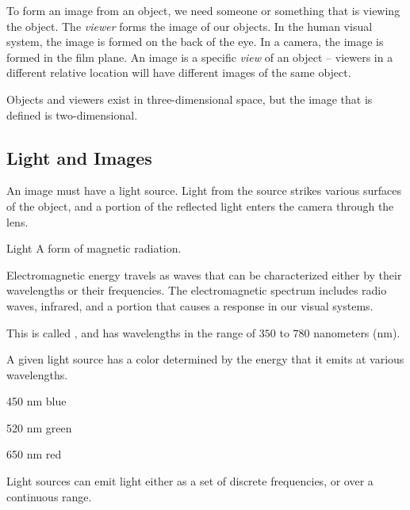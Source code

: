 \documentclass[\main/notes.tex]{subfiles}
\begin{document}
        To form an image from an object, we need someone or something that is viewing the object.
        The \emph{viewer} forms the image of our objects.
        In the human visual system, the image is formed on the back of the eye.
        In a camera, the image is formed in the film plane.
        An image is a specific \emph{view} of an object -- viewers in a different relative
        location will have different images of the same object.

        Objects and viewers exist in three-dimensional space,
        but the image that is defined is two-dimensional.

      \subsection{Light and Images}
        An image must have a light source.
        Light from the source strikes various surfaces of the object,
        and a portion of the reflected light enters the camera through the lens.

        \begin{definition}{Light}
          A form of magnetic radiation.

          Electromagnetic energy travels as waves that can be characterized either by
          their wavelengths or their frequencies.
          The electromagnetic spectrum includes radio waves, infrared, and a portion that
          causes a response in our visual systems.

          This  is called ,
          and has wavelengths in the range of $350$ to $780$ nanometers (nm).

          A given light source has a color determined by the energy that it emits at various
          wavelengths.

          \begin{indentparagraph}
            \begin{descriptimize}[nosep]
              \item[450 nm] blue
              \item[520 nm] green
              \item[650 nm] red
            \end{descriptimize}
          \end{indentparagraph}
        \end{definition}

        Light sources can emit light either as a set of discrete frequencies,
        or over a continuous range.
\end{document}
